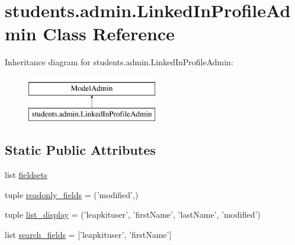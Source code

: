 \hypertarget{classstudents_1_1admin_1_1_linked_in_profile_admin}{\section{students.\-admin.\-Linked\-In\-Profile\-Admin Class Reference}
\label{classstudents_1_1admin_1_1_linked_in_profile_admin}
}
Inheritance diagram for students.\-admin.\-Linked\-In\-Profile\-Admin\-:\begin{figure}[H]
\begin{center}
\leavevmode
\includegraphics[height=2.000000cm]{classstudents_1_1admin_1_1_linked_in_profile_admin}
\end{center}
\end{figure}
\subsection*{Static Public Attributes}
\begin{DoxyCompactItemize}
\item 
list \hyperlink{classstudents_1_1admin_1_1_linked_in_profile_admin_a49860d8113b436c82419cdb40f94cf7e}{fieldsets}
\item 
tuple \hyperlink{classstudents_1_1admin_1_1_linked_in_profile_admin_abd0c2a04fc225eba9b673e20ff8e3f23}{readonly\-\_\-fields} = ('modified',)
\item 
tuple \hyperlink{classstudents_1_1admin_1_1_linked_in_profile_admin_ae5480d47cffc8596e57f5a3fa03dc0bb}{list\-\_\-display} = ('leapkituser', 'first\-Name', 'last\-Name', 'modified')
\item 
list \hyperlink{classstudents_1_1admin_1_1_linked_in_profile_admin_a6d9b8f11fae479f690c2db995e7a0bb5}{search\-\_\-fields} = \mbox{[}'leapkituser', 'first\-Name'\mbox{]}
\end{DoxyCompactItemize}



